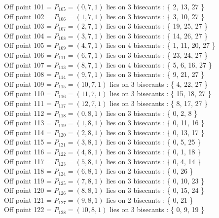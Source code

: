 \documentclass{article}
\begin{document}
{Off point 101 = $P_{105} = ( 0, 7, 1 )$ lies on 3 bisecants : \{ 2, 13, 27 \}\\
Off point 102 = $P_{106} = ( 1, 7, 1 )$ lies on 3 bisecants : \{ 3, 10, 27 \}\\
Off point 103 = $P_{107} = ( 2, 7, 1 )$ lies on 3 bisecants : \{ 19, 25, 27 \}\\
Off point 104 = $P_{108} = ( 3, 7, 1 )$ lies on 3 bisecants : \{ 14, 26, 27 \}\\
Off point 105 = $P_{109} = ( 4, 7, 1 )$ lies on 4 bisecants : \{ 1, 11, 20, 27 \}\\
Off point 106 = $P_{111} = ( 6, 7, 1 )$ lies on 3 bisecants : \{ 23, 24, 27 \}\\
Off point 107 = $P_{113} = ( 8, 7, 1 )$ lies on 4 bisecants : \{ 5, 6, 16, 27 \}\\
Off point 108 = $P_{114} = ( 9, 7, 1 )$ lies on 3 bisecants : \{ 9, 21, 27 \}\\
Off point 109 = $P_{115} = ( 10, 7, 1 )$ lies on 3 bisecants : \{ 4, 22, 27 \}\\
Off point 110 = $P_{116} = ( 11, 7, 1 )$ lies on 3 bisecants : \{ 15, 18, 27 \}\\
Off point 111 = $P_{117} = ( 12, 7, 1 )$ lies on 3 bisecants : \{ 8, 17, 27 \}\\
Off point 112 = $P_{118} = ( 0, 8, 1 )$ lies on 3 bisecants : \{ 0, 2, 8 \}\\
Off point 113 = $P_{119} = ( 1, 8, 1 )$ lies on 3 bisecants : \{ 0, 11, 16 \}\\
Off point 114 = $P_{120} = ( 2, 8, 1 )$ lies on 3 bisecants : \{ 0, 13, 17 \}\\
Off point 115 = $P_{121} = ( 3, 8, 1 )$ lies on 3 bisecants : \{ 0, 5, 25 \}\\
Off point 116 = $P_{122} = ( 4, 8, 1 )$ lies on 3 bisecants : \{ 0, 1, 18 \}\\
Off point 117 = $P_{123} = ( 5, 8, 1 )$ lies on 3 bisecants : \{ 0, 4, 14 \}\\
Off point 118 = $P_{124} = ( 6, 8, 1 )$ lies on 2 bisecants : \{ 0, 26 \}\\
Off point 119 = $P_{125} = ( 7, 8, 1 )$ lies on 3 bisecants : \{ 0, 10, 23 \}\\
Off point 120 = $P_{126} = ( 8, 8, 1 )$ lies on 3 bisecants : \{ 0, 15, 24 \}\\
Off point 121 = $P_{127} = ( 9, 8, 1 )$ lies on 2 bisecants : \{ 0, 21 \}\\
Off point 122 = $P_{128} = ( 10, 8, 1 )$ lies on 3 bisecants : \{ 0, 9, 19 \}\\
}
\end{document}
